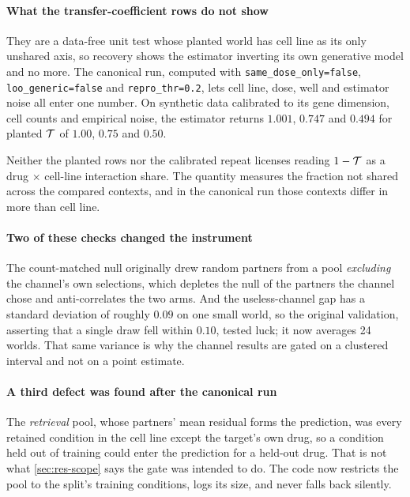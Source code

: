\paragraph{What the transfer-coefficient rows do not show} They are a data-free
unit test whose planted world has cell line as its only unshared axis, so
recovery shows the estimator inverting its own generative model and no more. The
canonical run, computed with \texttt{same\_dose\_only=false},
\texttt{loo\_generic=false} and \texttt{repro\_thr=0.2}, lets cell line, dose,
well and estimator noise all enter one number. On synthetic data calibrated to
its gene dimension, cell counts and empirical noise, the estimator returns
$1.001$, $0.747$ and $0.494$ for planted $\mathcal{T}$ of $1.00$, $0.75$ and $0.50$.

\begin{scopelimit}
Neither the planted rows nor the calibrated repeat licenses reading
$1 - \mathcal{T}$ as a drug $\times$ cell-line interaction share. The quantity
measures the fraction not shared across the compared contexts, and in the
canonical run those contexts differ in more than cell line.
\end{scopelimit}

\paragraph{Two of these checks changed the instrument} The count-matched null
originally drew random partners from a pool \emph{excluding} the channel's own
selections, which depletes the null of the partners the channel chose and
anti-correlates the two arms. And the useless-channel gap has a standard
deviation of roughly $0.09$ on one small world, so the original validation,
asserting that a single draw fell within $0.10$, tested luck; it now averages 24
worlds. That same variance is why the channel results are gated on a clustered
interval and not on a point estimate.

\paragraph{A third defect was found after the canonical run} The \emph{retrieval}
pool, whose partners' mean residual forms the prediction, was every retained
condition in the cell line except the target's own drug, so a condition held out
of training could enter the prediction for a held-out drug. That is not what
\cref{sec:res-scope} says the gate was intended to do. The code now restricts
the pool to the split's training conditions, logs its size, and never falls back
silently.

